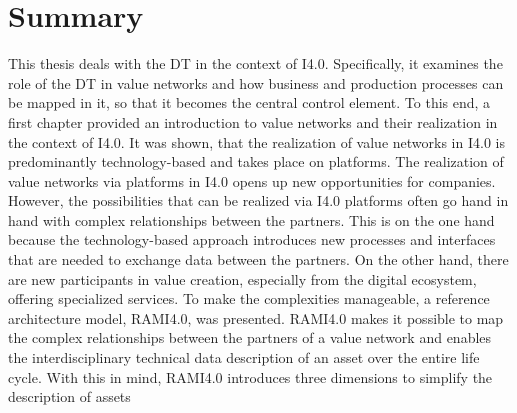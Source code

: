 \chapter{Summary} \label{chap:summary}

This thesis deals with the \ac{DT} in the context of \ac{I4.0}. Specifically, it examines the role of the \ac{DT} in value networks and how business and production processes can be mapped in it, so that it becomes the central control element. To this end, a first chapter provided an introduction to value networks and their realization in the context of \ac{I4.0}. It was shown, that the realization of value networks in \ac{I4.0} is predominantly technology-based and takes place on platforms. The realization of value networks via platforms in \ac{I4.0} opens up new opportunities for companies. However, the possibilities that can be realized via \ac{I4.0} platforms often go hand in hand with complex relationships between the partners. This is on the one hand because the technology-based approach introduces new processes and interfaces that are needed to exchange data between the partners. On the other hand, there are new participants in value creation, especially from the digital ecosystem, offering specialized services. To make the complexities manageable, a reference architecture model, \ac{RAMI4.0}, was presented. \ac{RAMI4.0} makes it possible to map the complex relationships between the partners of a value network and enables the interdisciplinary technical data description of an asset over the entire life cycle. With this in mind, \ac{RAMI4.0} introduces three dimensions to simplify the description of assets 